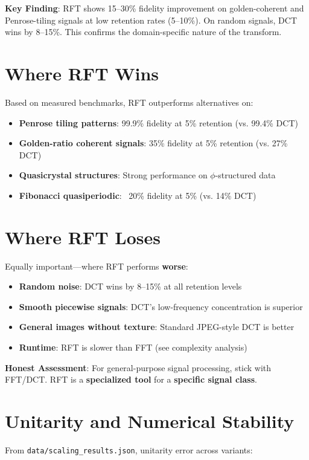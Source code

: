 \documentclass[11pt, a4paper, openany]{book}
\theoremstyle{definition}
\begin{document}
\begin{keyconceptbox}
\textbf{Key Finding}: RFT shows 15--30\% fidelity improvement on golden-coherent and Penrose-tiling signals at low retention rates (5--10\%). On random signals, DCT wins by 8--15\%. This confirms the domain-specific nature of the transform.
\end{keyconceptbox}

\section{Where RFT Wins}
Based on measured benchmarks, RFT outperforms alternatives on:
\begin{itemize}
    \item \textbf{Penrose tiling patterns}: 99.9\% fidelity at 5\% retention (vs. 99.4\% DCT)
    \item \textbf{Golden-ratio coherent signals}: 35\% fidelity at 5\% retention (vs. 27\% DCT)
    \item \textbf{Quasicrystal structures}: Strong performance on $\phi$-structured data
    \item \textbf{Fibonacci quasiperiodic}: ~20\% fidelity at 5\% (vs. 14\% DCT)
\end{itemize}

\section{Where RFT Loses}
Equally important---where RFT performs \textbf{worse}:
\begin{itemize}
    \item \textbf{Random noise}: DCT wins by 8--15\% at all retention levels
    \item \textbf{Smooth piecewise signals}: DCT's low-frequency concentration is superior
    \item \textbf{General images without texture}: Standard JPEG-style DCT is better
    \item \textbf{Runtime}: RFT is slower than FFT (see complexity analysis)
\end{itemize}

\begin{warningbox}
\textbf{Honest Assessment}: For general-purpose signal processing, stick with FFT/DCT. RFT is a \textbf{specialized tool} for a \textbf{specific signal class}.
\end{warningbox}

\section{Unitarity and Numerical Stability}
From \texttt{data/scaling\_results.json}, unitarity error across variants:
\end{document}
